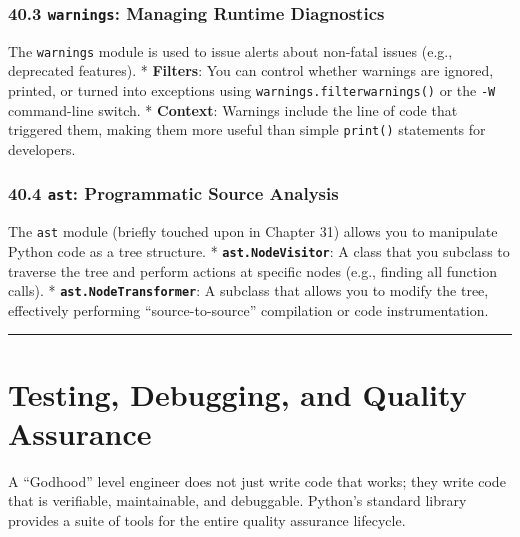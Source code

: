\hypertarget{warnings-managing-runtime-diagnostics}{%
\subsection{\texorpdfstring{40.3 \texttt{warnings}: Managing Runtime
Diagnostics}{40.3 warnings: Managing Runtime Diagnostics}}\label{warnings-managing-runtime-diagnostics}}

The \passthrough{\lstinline!warnings!} module is used to issue alerts
about non-fatal issues (e.g., deprecated features). * \textbf{Filters}:
You can control whether warnings are ignored, printed, or turned into
exceptions using \passthrough{\lstinline!warnings.filterwarnings()!} or
the \passthrough{\lstinline!-W!} command-line switch. *
\textbf{Context}: Warnings include the line of code that triggered them,
making them more useful than simple \passthrough{\lstinline!print()!}
statements for developers.

\hypertarget{ast-programmatic-source-analysis}{%
\subsection{\texorpdfstring{40.4 \texttt{ast}: Programmatic Source
Analysis}{40.4 ast: Programmatic Source Analysis}}\label{ast-programmatic-source-analysis}}

The \passthrough{\lstinline!ast!} module (briefly touched upon in
Chapter 31) allows you to manipulate Python code as a tree structure. *
\textbf{\passthrough{\lstinline!ast.NodeVisitor!}}: A class that you
subclass to traverse the tree and perform actions at specific nodes
(e.g., finding all function calls). *
\textbf{\passthrough{\lstinline!ast.NodeTransformer!}}: A subclass that
allows you to modify the tree, effectively performing
``source-to-source'' compilation or code instrumentation.

\begin{center}\rule{0.5\linewidth}{0.5pt}\end{center}

\hypertarget{testing-debugging-and-quality-assurance}{%
\chapter{Testing, Debugging, and Quality
Assurance}\label{testing-debugging-and-quality-assurance}}

A ``Godhood'' level engineer does not just write code that works; they
write code that is verifiable, maintainable, and debuggable. Python's
standard library provides a suite of tools for the entire quality
assurance lifecycle.


